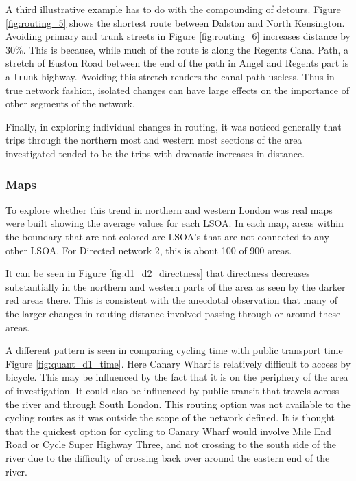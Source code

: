 A third illustrative example has to do with the compounding of detours. Figure \ref{fig:routing_5} shows the shortest route between Dalston and North Kensington. Avoiding primary and trunk streets in Figure \ref{fig:routing_6} increases distance by 30\%. This is because, while much of the route is along the Regents Canal Path, a stretch of Euston Road between the end of the path in Angel and Regents part is a \texttt{trunk} highway. Avoiding this stretch renders the canal path useless. Thus in true network fashion, isolated changes can have large effects on the importance of other segments of the network. 

Finally, in exploring individual changes in routing, it was noticed generally that trips through the northern most and western most sections of the area investigated tended to be the trips with dramatic increases in distance. 

\subsubsection{Maps}

To explore whether this trend in northern and western London was real maps were built showing the average values for each LSOA. In each map, areas within the boundary that are not colored are LSOA's that are not connected to any other LSOA. For Directed network 2, this is about 100 of 900 areas.  

It can be seen in Figure \ref{fig:d1_d2_directness} that directness decreases substantially in the northern and western parts of the area as seen by the darker red areas there. This is consistent with the anecdotal observation that many of the larger changes in routing distance involved passing through or around these areas. 

A different pattern is seen in comparing cycling time with public transport time Figure \ref{fig:quant_d1_time}. Here Canary Wharf is relatively difficult to access by bicycle. This may be influenced by the fact that it is on the periphery of the area of investigation. It could also be influenced by public transit that travels across the river and through South London. This routing option was not available to the cycling routes as it was outside the scope of the network defined. It is thought that the quickest option for cycling to Canary Wharf would involve Mile End Road or Cycle Super Highway Three, and not crossing to the south side of the river due to the difficulty of crossing back over around the eastern end of the river. 




